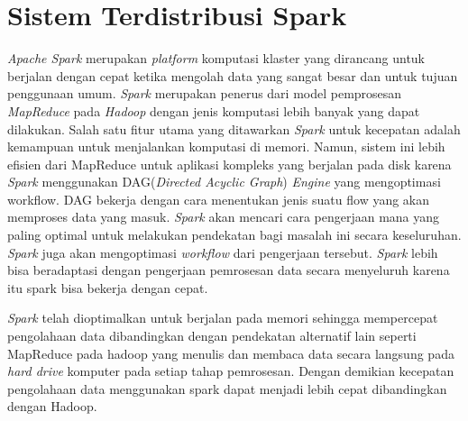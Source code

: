 \section{Sistem Terdistribusi Spark}
\textit{Apache Spark} merupakan \textit{platform} komputasi klaster yang dirancang untuk berjalan dengan cepat ketika mengolah data yang sangat besar dan untuk tujuan penggunaan umum. \textit{Spark} merupakan penerus dari model pemprosesan \textit{MapReduce} pada \textit{Hadoop} dengan jenis komputasi lebih banyak yang dapat dilakukan. Salah satu fitur utama yang ditawarkan \textit{Spark} untuk kecepatan adalah kemampuan untuk menjalankan komputasi di memori. Namun, sistem ini lebih efisien dari MapReduce untuk aplikasi kompleks yang berjalan pada disk karena \textit{Spark} menggunakan DAG(\textit{Directed Acyclic Graph}) \textit{Engine} yang mengoptimasi workflow. DAG bekerja dengan cara  menentukan jenis suatu flow yang akan memproses data yang masuk. \textit{Spark} akan mencari cara pengerjaan mana yang paling optimal untuk melakukan pendekatan bagi masalah ini secara keseluruhan. \textit{Spark} juga akan mengoptimasi \textit{workflow} dari pengerjaan tersebut. \textit{Spark} lebih bisa beradaptasi dengan pengerjaan pemrosesan data secara menyeluruh karena itu spark bisa bekerja dengan cepat.

\textit{Spark} telah dioptimalkan untuk berjalan pada memori sehingga mempercepat pengolahaan data dibandingkan dengan pendekatan alternatif lain seperti MapReduce pada hadoop yang menulis dan membaca data secara langsung pada \textit{hard drive} komputer pada setiap tahap pemrosesan. Dengan demikian kecepatan pengolahaan data menggunakan spark dapat menjadi lebih cepat dibandingkan dengan Hadoop. 

